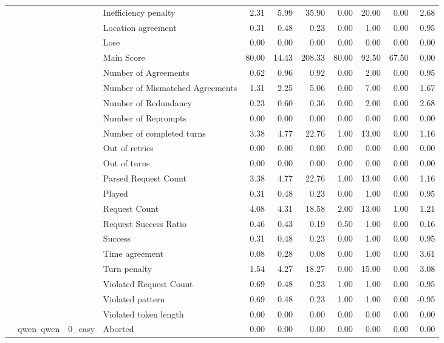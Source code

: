 \begin{tabular}{llllrrrrrrr}
 &  &  & Inefficiency penalty & 2.31 & 5.99 & 35.90 & 0.00 & 20.00 & 0.00 & 2.68 \\
 &  &  & Location agreement & 0.31 & 0.48 & 0.23 & 0.00 & 1.00 & 0.00 & 0.95 \\
 &  &  & Lose & 0.00 & 0.00 & 0.00 & 0.00 & 0.00 & 0.00 & 0.00 \\
 &  &  & Main Score & 80.00 & 14.43 & 208.33 & 80.00 & 92.50 & 67.50 & 0.00 \\
 &  &  & Number of Agreements & 0.62 & 0.96 & 0.92 & 0.00 & 2.00 & 0.00 & 0.95 \\
 &  &  & Number of Mismatched Agreements & 1.31 & 2.25 & 5.06 & 0.00 & 7.00 & 0.00 & 1.67 \\
 &  &  & Number of Redundancy & 0.23 & 0.60 & 0.36 & 0.00 & 2.00 & 0.00 & 2.68 \\
 &  &  & Number of Reprompts & 0.00 & 0.00 & 0.00 & 0.00 & 0.00 & 0.00 & 0.00 \\
 &  &  & Number of completed turns & 3.38 & 4.77 & 22.76 & 1.00 & 13.00 & 0.00 & 1.16 \\
 &  &  & Out of retries & 0.00 & 0.00 & 0.00 & 0.00 & 0.00 & 0.00 & 0.00 \\
 &  &  & Out of turns & 0.00 & 0.00 & 0.00 & 0.00 & 0.00 & 0.00 & 0.00 \\
 &  &  & Parsed Request Count & 3.38 & 4.77 & 22.76 & 1.00 & 13.00 & 0.00 & 1.16 \\
 &  &  & Played & 0.31 & 0.48 & 0.23 & 0.00 & 1.00 & 0.00 & 0.95 \\
 &  &  & Request Count & 4.08 & 4.31 & 18.58 & 2.00 & 13.00 & 1.00 & 1.21 \\
 &  &  & Request Success Ratio & 0.46 & 0.43 & 0.19 & 0.50 & 1.00 & 0.00 & 0.16 \\
 &  &  & Success & 0.31 & 0.48 & 0.23 & 0.00 & 1.00 & 0.00 & 0.95 \\
 &  &  & Time agreement & 0.08 & 0.28 & 0.08 & 0.00 & 1.00 & 0.00 & 3.61 \\
 &  &  & Turn penalty & 1.54 & 4.27 & 18.27 & 0.00 & 15.00 & 0.00 & 3.08 \\
 &  &  & Violated Request Count & 0.69 & 0.48 & 0.23 & 1.00 & 1.00 & 0.00 & -0.95 \\
 &  &  & Violated pattern & 0.69 & 0.48 & 0.23 & 1.00 & 1.00 & 0.00 & -0.95 \\
 &  &  & Violated token length & 0.00 & 0.00 & 0.00 & 0.00 & 0.00 & 0.00 & 0.00 \\
\cline{2-11} \cline{3-11}
 & \multirow[t]{378}{*}{qwen--qwen} & \multirow[t]{27}{*}{0_easy} & Aborted & 0.00 & 0.00 & 0.00 & 0.00 & 0.00 & 0.00 & 0.00 \\

\end{tabular}
